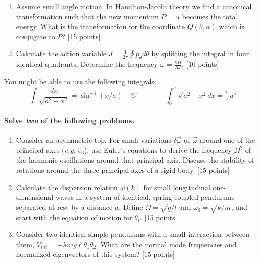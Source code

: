 \documentclass[letterpaper,11pt]{article}
\begin{document}
\begin{enumerate}
\begin{enumerate}
  \item Assume small angle motion.  In Hamilton-Jacobi theory we find a canonical transformation such that the new momentum $P = \alpha$ becomes the total energy.  What is the transformation for the coordinate $Q(\theta,\alpha)$ which is conjugate to $P$? [15 points]
  \item Calculate the action variable $J = \frac{1}{2\pi} \oint p_\theta d\theta$ by splitting the integral in four identical quadrants.  Determine the frequency $\omega = \frac{\partial H}{\partial J}$. [10 points]
 \end{enumerate}
 You might be able to use the following integrals:
 \begin{equation*}
  \int \frac{dx}{\sqrt{a^2 - x^2}} = \sin^{-1}(x/a) + C \qquad \qquad \int_0^a \sqrt{a^2 - x^2} dx = \frac{\pi}{4}a^2
 \end{equation*}
\end{enumerate}

\paragraph{Solve \emph{two} of the following problems.}
\begin{enumerate}[resume]
 \item Consider an asymmetric top.  For small variations $\delta\vec\omega$ of $\vec\omega$ around one of the principal axes (\textit{e.g.} $\hat{e}_3$), use Euler's equations to derive the frequency $\Omega^2$ of the harmonic oscillations around that principal axis.  Discuss the stability of rotations around the three principal axes of a rigid body. [15 points]
 \item Calculate the dispersion relation $\omega(k)$ for small longitudinal one-dimensional waves in a system of identical, spring-coupled pendulums separated at rest by a distance $a$.  Define $\Omega = \sqrt{g/l}$ and $\omega_0 = \sqrt{k/m}$, and start with the equation of motion for $\theta_i$. [15 points]
 \item Consider two identical simple pendulums with a small interaction between them, $V_{int} = -\lambda mg\ell\theta_1\theta_2$.  What are the normal mode frequencies and normalized eigenvectors of this system? [15 points]
\end{enumerate}
\end{document}
